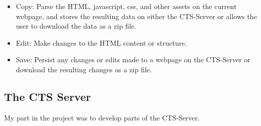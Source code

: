 \documentclass[12pt]{article}
\begin{document}
\begin{itemize}
  \item Copy: Parse the HTML, javascript, css, and other assets on the current webpage, and stores the resulting data on either the CTS-Server or allows the user to download the data as a zip file.
  \item Edit: Make changes to the HTML content or structure.
  \item Save: Persist any changes or edits made to a webpage on the CTS-Server or download the resulting changes as a zip file.
\end{itemize}

\subsection{The CTS Server}

My part in the project was to develop parts of the CTS-Server.
\end{document}
